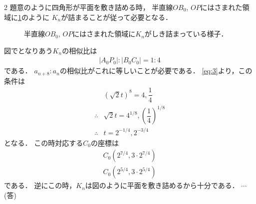 \documentclass[../../main.tex]{subfiles}
\begin{document}
\begin{multicols}{2}
  題意のように四角形が平面を敷き詰める時，
  半直線$OB_0$, $OP$にはさまれた領域に\cref{1999-3:fig:3}のように
  $K_n$が詰まることが従って必要となる．

  \begin{figure}[H]
    \centering
    \caption{半直線$OB_0$, $OP$にはさまれた領域に$K_n$がしき詰まっている様子．}
    \label{1999-3:fig:3}
  \end{figure}

  図でとなりあう$K_n$の相似比は
  \begin{align}
    |A_0P_0| : |B_0C_0| = 1:4
  \end{align}
  である．
  $a_{n+8}:a_{n}$の相似比がこれに等しいことが必要である．
  \cref{eq:3}より，この条件は
  \begin{align}
    & \left(\sqrt{2}t\right)^{8} = 4, \dfrac{1}{4}       \\
    \therefore
    & \sqrt{2}t=4^{1/8}, \left(\dfrac{1}{4}\right)^{1/8} \\
    \therefore
    & t=2^{-1/4}, 2^{-3/4}
  \end{align}
  となる．
  この時対応する$C_0$の座標は
  \begin{align}
    C_0(2^{7/4}, 3 \cdot 2^{7/4}) \\
    C_0(2^{5/4}, 3 \cdot 2^{5/4})
  \end{align}
  である．
  逆にこの時，$K_n$は図のように平面を敷き詰めるから十分である．
  $\cdots$(答)

  \begin{figure}[H]
    \centering
    \begin{tikzpicture}


\end{tikzpicture}
\end{figure}
\end{multicols}
\end{document}
